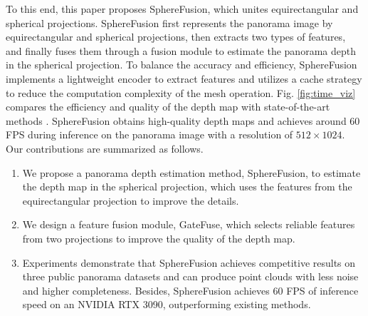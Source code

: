 To this end, this paper proposes SphereFusion, which unites equirectangular and spherical projections.
SphereFusion first represents the panorama image by equirectangular and spherical projections, then extracts two types of features, and finally fuses them through a fusion module to estimate the panorama depth in the spherical projection.
To balance the accuracy and efficiency, SphereFusion implements a lightweight encoder to extract features \cite{he2016deep} and utilizes a cache strategy to reduce the computation complexity of the mesh operation.
Fig. \ref{fig:time_viz} compares the efficiency and quality of the depth map with state-of-the-art methods \cite{wang2020bifuse,jiang2021unifuse,pintore2021slicenet,shen2022panoformer,li2022omnifusion,yan2022spheredepth,sun2021hohonet}.  
SphereFusion obtains high-quality depth maps and achieves around 60 FPS during inference on the panorama image with a resolution of $512 \times 1024$.
Our contributions are summarized as follows.

\begin{enumerate}

\item We propose a panorama depth estimation method, SphereFusion, to estimate the depth map in the spherical projection, which uses the features from the equirectangular projection to improve the details.
	
\item We design a feature fusion module, GateFuse, which selects reliable features from two projections to improve the quality of the depth map.
	
\item Experiments demonstrate that SphereFusion achieves competitive results on three public panorama datasets and can produce point clouds with less noise and higher completeness. Besides, SphereFusion achieves 60 FPS of inference speed on an NVIDIA RTX 3090, outperforming existing methods.

\end{enumerate}